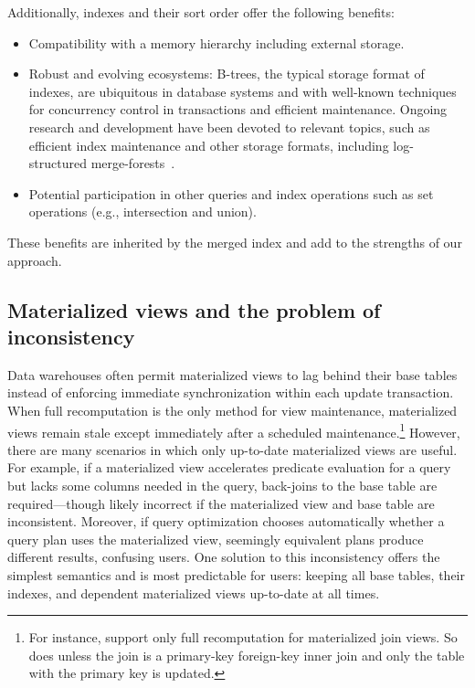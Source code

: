 \documentclass[biblatex, english]{lni}
\begin{document}
Additionally, indexes and their sort order offer the following benefits:
\begin{itemize}
    \item Compatibility with a memory hierarchy including external storage.
    \item Robust and evolving ecosystems: B-trees, the typical storage format of indexes, are ubiquitous in database systems and with well-known techniques for concurrency control in transactions and efficient maintenance.
    Ongoing research and development have been devoted to relevant topics, such as efficient index maintenance and other storage formats, including log-structured merge-forests~\cite{rocksdb21,wisckey,leanstore18,lepers2019kvell,dayan2017monkey}.
    \item Potential participation in other queries and index operations such as set operations (e.g., intersection and union).
\end{itemize}

\noindent These benefits are inherited by the merged index and add to the strengths of our approach.

\subsection{Materialized views and the problem of inconsistency}\label{ssec:classic-ivm}

Data warehouses often permit materialized views to lag behind their base tables instead of enforcing immediate synchronization within each update transaction.
When full recomputation is the only method for view maintenance, materialized views remain stale except immediately after a scheduled maintenance.\footnote{
    For instance, \citet{ibm2024mqts,postgresql2024incremental} support only full recomputation for materialized join views.
    So does \citet{mysql2024viewupdatability} unless the join is a primary-key foreign-key inner join and only the table with the primary key is updated.
}
However, there are many scenarios in which only up-to-date materialized views are useful.
For example, if a materialized view accelerates predicate evaluation for a query but lacks some columns needed in the query, back-joins to the base table are required---though likely incorrect if the materialized view and base table are inconsistent.
Moreover, if query optimization chooses automatically whether a query plan uses the materialized view, seemingly equivalent plans produce different results, confusing users.
One solution to this inconsistency offers the simplest semantics and is most predictable for users: keeping all base tables, their indexes, and dependent materialized views up-to-date at all times.
\end{document}
